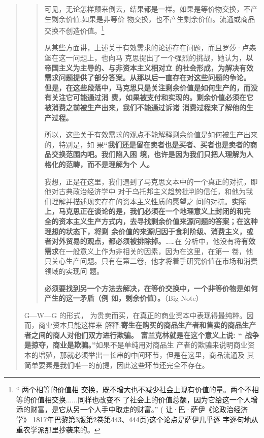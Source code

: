 \begin{quotation}
\begin{quotation}
可见，无论怎样颠来倒去，结果都是一样。如果是等价物交换，不产生剩余价值;如果是非等价
物交换，也不产生剩余价值。流通或商品交换不创造价值。\footnote{“ 两个相等的价值相
交换，既不增大也不减少社会上现有价值的量。两个不相等的价值相交换......同样也改变不
了社会上的价值总额，因为它给这一个人增添的财富，是它从另一个人手中取走的财富。” (
让·巴·萨伊《论政治经济学》 1817年巴黎第3版第2卷第443、444页)这个论点是萨伊几乎逐
字逐句地从重农学派那里抄袭来的。}

\bigskip

从某些方面讲，上述关于有效需求的论述存在问题，而且罗莎·卢森堡在这一问题上，也向马
克思提出了一个强烈的挑战，她认为，\textbf{以帝国主义为主导的、与非资本主义相对立
  的社会形成，为解决有效需求问题提供了部分答案。从那以后一直存在对这些问题的争论。
  但是，在这些段落中，马克思只是关注剩余价值是如何生产的，而没有关注它可能通过消
  费，如果被支付和实现的。剩余价值必须在它被消费之前被生产出来，我们不能通过诉诸
  消费过程来了解他的生产过程。}

所以，这些关于有效需求的观点不能解释剩余价值是如何被生产出来的，特别是，如
果\textbf{“我们还是留在卖者也是买者、买者也是卖者的商品交换范围内吧。我们陷入困
  境，也许是因为我们只把人理解为人格化的范畴，而不是理解为个
  人。}

我想，正是在这里，我们遇到了马克思文本中的一个真正的对抗，即他对古典政治经济学中
对于乌托邦主义趋势批判的信任，和他为我们理解并描述现实存在的资本主义性质的愿望之
间的对抗。\textbf{实际上，马克思正在谈论的是，我们必须在一个地理意义上封闭的和完
  全的资本主义生产方式内，去寻找剩余价值来源问题的答案；在这种理想的状态下，将剩
余价值的来源归因于食利阶级、消费主义，或者对外贸易的观点，都必须被排除掉。}……在
分析中，他没有将\textbf{有效需求}在一般意义上作为非相关的因素，因为在这里，在第一
卷，他只关心生产问题。只有在第二卷，他才将着手研究价值在市场和消费领域的实现问
题。

\textbf{必须要找到另一个方法去解决，在等价交换中，一个非等价物是如何产生的这一矛盾（例
如，剩余价值）。}（Big Note）

\end{quotation}

G—W—G 的形式， 为贵卖而买，在真正的商业资本中表现得最纯粹。因而，商业资本只能这样来
解释:\textbf{寄生在购买的商品生产者和售卖的商品生产者之间的商人对他们双方进行欺骗。
  富兰克林就是在这个意义上说: “ 战争是掠夺，商业是欺骗。”}如果不是单纯用对商品生
产者的欺骗来说明商业资本的增殖，那就必须举出一长串的中间环节，但是在这里，商品流通及
其简单要素是我们唯一的前提，因此这些环节还完全不存在。 


\end{quotation}
